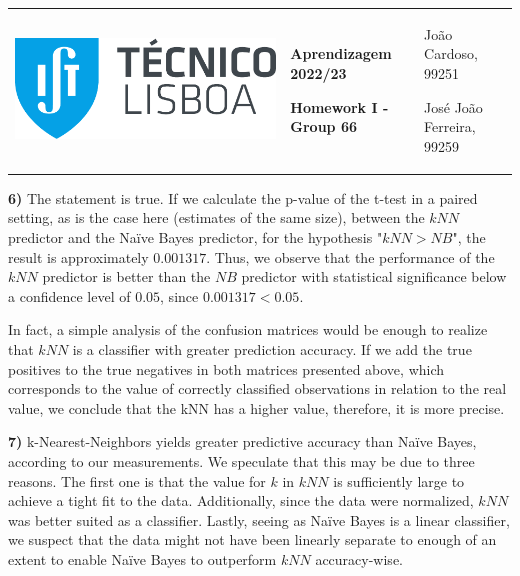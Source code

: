 \documentclass[11pt,a4paper]{article}
\begin{document}
\color{darkgray}
\hspace{-8.25mm}
\begin{tabularx}{1.09\textwidth} {>{\raggedright\arraybackslash}X >{\centering\arraybackslash}X >{\raggedleft\arraybackslash}X}
  \includegraphics[scale=0.2]{tecnico.pdf} &
  \textbf{Aprendizagem 2022/23} \par \textbf{Homework I - Group 66} &
  João Cardoso, 99251 \par José João Ferreira, 99259
\end{tabularx}
\color{black}

\begin{center}
\textbf{ }
\end{center}

\begin{flushleft}
\textbf{6)}
  The statement is true. If we calculate the p-value of the t-test in a paired setting, as is the case here (estimates of the same size), between the $kNN$ predictor and the Naïve Bayes predictor, for the hypothesis "$kNN > NB$", the result is approximately $0.001317$. Thus, we observe that the performance of the $kNN$ predictor is better than the $NB$ predictor with statistical significance below a confidence level of $0.05$, since $0.001317 < 0.05$.
  \par
  In fact, a simple analysis of the confusion matrices would be enough to realize that $kNN$ is a classifier with greater prediction accuracy. If we add the true positives to the true negatives in both matrices presented above, which corresponds to the value of correctly classified observations in relation to the real value, we conclude that the kNN has a higher value, therefore, it is more precise.
\end{flushleft}

\vspace{2.5mm}
\begin{flushleft}
\textbf{7)}
  k-Nearest-Neighbors yields greater predictive accuracy than Naïve Bayes, according to our measurements. We speculate that this may be due to three reasons. The first one is that the value for $k$ in $kNN$ is sufficiently large to achieve a tight fit to the data. Additionally, since the data were normalized, $kNN$ was better suited as a classifier. Lastly, seeing as Naïve Bayes is a linear classifier, we suspect that the data might not have been linearly separate to enough of an extent to enable Naïve Bayes to outperform $kNN$ accuracy-wise.
\end{flushleft}
\end{document}
